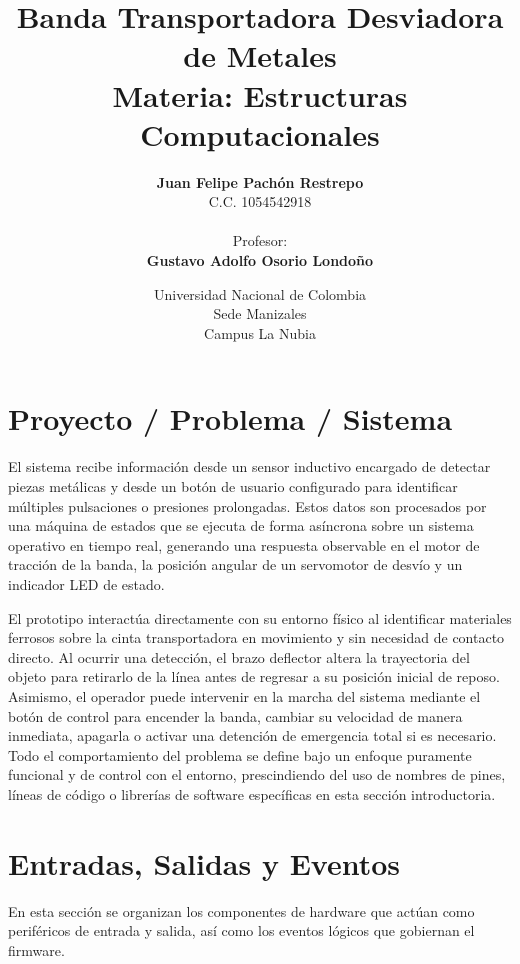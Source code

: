 \documentclass[12pt, letterpaper]{article}
\title{
    \vspace{2cm}
    \Huge \textsf{\textbf{Banda Transportadora Desviadora de Metales}} \\
    \vspace{1cm}
    \large Materia: Estructuras Computacionales \\
    \vspace{2cm}
}
\author{
    \textbf{Juan Felipe Pachón Restrepo} \\
    C.C. 1054542918 \\
    \vspace{1.5cm} \\
    Profesor: \\
    \textbf{Gustavo Adolfo Osorio Londoño}
}
\date{
    \vfill
    Universidad Nacional de Colombia \\
    Sede Manizales \\
    Campus La Nubia
}
\begin{document}
\maketitle
\thispagestyle{empty} %
\clearpage

\tableofcontents
\clearpage

\section{Proyecto / Problema / Sistema}
\label{sec:proyecto_problema_sistema}

El sistema recibe información desde un sensor inductivo encargado de detectar piezas metálicas y desde un botón de usuario configurado para identificar múltiples pulsaciones o presiones prolongadas. Estos datos son procesados por una máquina de estados que se ejecuta de forma asíncrona sobre un sistema operativo en tiempo real, generando una respuesta observable en el motor de tracción de la banda, la posición angular de un servomotor de desvío y un indicador LED de estado.

El prototipo interactúa directamente con su entorno físico al identificar materiales ferrosos sobre la cinta transportadora en movimiento y sin necesidad de contacto directo. Al ocurrir una detección, el brazo deflector altera la trayectoria del objeto para retirarlo de la línea antes de regresar a su posición inicial de reposo. Asimismo, el operador puede intervenir en la marcha del sistema mediante el botón de control para encender la banda, cambiar su velocidad de manera inmediata, apagarla o activar una detención de emergencia total si es necesario. Todo el comportamiento del problema se define bajo un enfoque puramente funcional y de control con el entorno, prescindiendo del uso de nombres de pines, líneas de código o librerías de software específicas en esta sección introductoria.

\clearpage

\section{Entradas, Salidas y Eventos}
\label{sec:entradas_salidas_eventos}

En esta sección se organizan los componentes de hardware que actúan como periféricos de entrada y salida, así como los eventos lógicos que gobiernan el firmware.
\end{document}
